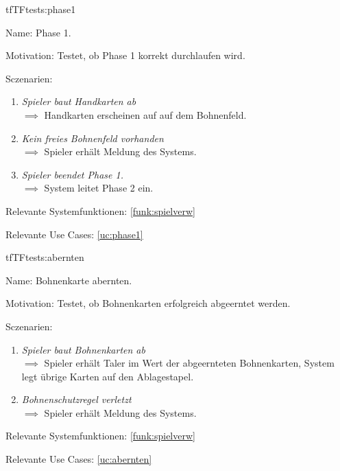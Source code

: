 \begin{description}[leftmargin=5em, style=sameline]
\begin{lhp}{tf}{TF}{tests:phase1}
	\item [Name:] Phase 1.
	\item [Motivation:] Testet, ob Phase 1 korrekt durchlaufen wird.
	\item [Sczenarien:] \hfill
	\begin{enumerate}
		\item \textit{Spieler baut Handkarten ab} \\ $\implies$ Handkarten erscheinen auf auf dem Bohnenfeld.
		\item \textit{Kein freies Bohnenfeld vorhanden} \\ $\implies$ Spieler erhält Meldung des Systems.
		\item \textit{Spieler beendet Phase 1.} \\ $\implies$ System leitet Phase 2 ein.
	\end{enumerate}
	\item [Relevante Systemfunktionen:] \ref{funk:spielverw}
	\item [Relevante Use Cases:] \ref{uc:phase1}
\end{lhp}


\begin{lhp}{tf}{TF}{tests:abernten}
	\item [Name:] Bohnenkarte abernten.
	\item [Motivation:] Testet, ob Bohnenkarten erfolgreich abgeerntet werden.
	\item [Sczenarien:] \hfill
	\begin{enumerate}
		\item \textit{Spieler baut Bohnenkarten ab} \\ $\implies$ Spieler erhält Taler im Wert der abgeernteten Bohnenkarten, System legt übrige Karten auf den Ablagestapel.
		\item \textit{Bohnenschutzregel verletzt} \\ $\implies$ Spieler erhält Meldung des Systems.
	\end{enumerate}
	\item [Relevante Systemfunktionen:] \ref{funk:spielverw}
	\item [Relevante Use Cases:] \ref{uc:abernten}
\end{lhp}


\end{description}
